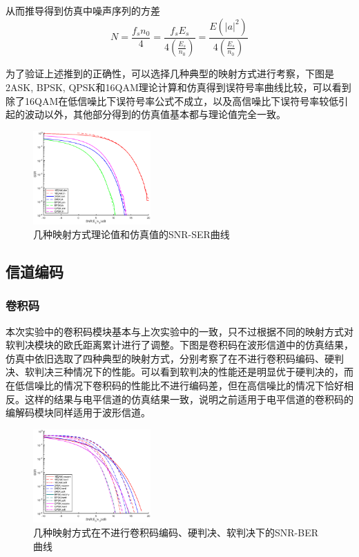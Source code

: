 从而推导得到仿真中噪声序列的方差
\begin{equation*}
N=\frac{f_sn_0}{4}=\frac{f_sE_s}{4(\frac{E_s}{n_0})}=\frac{E(|a|^2)}{4(\frac{E_s}{n_0})}
\end{equation*}

为了验证上述推到的正确性，可以选择几种典型的映射方式进行考察，下图是2ASK, BPSK, QPSK和16QAM理论计算和仿真得到误符号率曲线比较，可以看到除了16QAM在低信噪比下误符号率公式不成立，以及高信噪比下误符号率较低引起的波动以外，其他部分得到的仿真值基本都与理论值完全一致。

\begin{figure}[h]
    \centering
    \includegraphics[width=0.4\textwidth]{./pic/SNR_SER.eps}
    \caption{几种映射方式理论值和仿真值的SNR-SER曲线}
\end{figure}

\subsection{信道编码}

\subsubsection{卷积码}

本次实验中的卷积码模块基本与上次实验中的一致，只不过根据不同的映射方式对软判决模块的欧氏距离累计进行了调整。下图是卷积码在波形信道中的仿真结果，仿真中依旧选取了四种典型的映射方式，分别考察了在不进行卷积码编码、硬判决、软判决三种情况下的性能。可以看到软判决的性能还是明显优于硬判决的，而在低信噪比的情况下卷积码的性能比不进行编码差，但在高信噪比的情况下恰好相反。这样的结果与电平信道的仿真结果一致，说明之前适用于电平信道的卷积码的编解码模块同样适用于波形信道。

\begin{figure}[h]
    \centering
    \includegraphics[width=0.4\textwidth]{./pic/conv_SNR_BER.eps}
    \caption{几种映射方式在不进行卷积码编码、硬判决、软判决下的SNR-BER曲线}
\end{figure}



